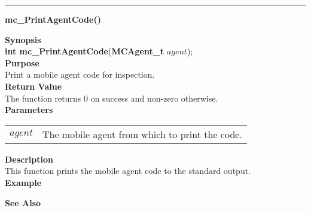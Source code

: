 \noindent
\vspace{5pt}
\rule{6.5in}{0.015in}
\noindent
{\LARGE \bf mc\_PrintAgentCode()}\\
{}

\noindent
{\bf Synopsis}\\
{\bf int mc\_PrintAgentCode}({\bf MCAgent\_t} $agent$);\\

\noindent
{\bf Purpose}\\
Print a mobile agent code for inspection.\\

\noindent
{\bf Return Value}\\
The function returns 0 on success and non-zero otherwise.\\

\noindent
{\bf Parameters}
\vspace{-0.1in}
\begin{description}
\item
\begin{tabular}{p{10 mm}p{145 mm}}
$agent$ & The mobile agent from which to print the code.
\end{tabular}
\end{description}

\noindent
{\bf Description}\\
This function prints the mobile agent code to the standard output.\\

\noindent
{\bf Example}\\
\noindent

\noindent
{\bf See Also}\\

